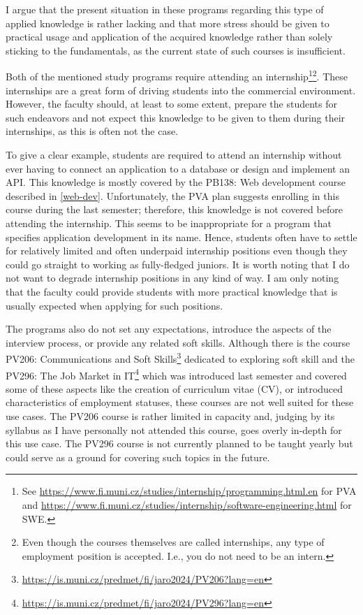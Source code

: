 \documentclass[
  digital,
  color,
  oneside,
  nosansbold,
  nocolorbold,
  nolof,
  nolot,
]{fithesis4}
\begin{document}
I argue that the present situation in these programs regarding this type of applied knowledge is rather lacking and that more stress should be given to practical usage and application of the acquired knowledge rather than solely sticking to the fundamentals, as the current state of such courses is insufficient.

Both of the mentioned study programs require attending an internship\footnote{See \url{https://www.fi.muni.cz/studies/internship/programming.html.en} for PVA and \url{https://www.fi.muni.cz/studies/internship/software-engineering.html} for SWE.}\footnote{Even though the courses themselves are called internships, any type of employment position is accepted. I.e., you do not need to be an intern.}. These internships are a great form of driving students into the commercial environment. However, the faculty should, at least to some extent, prepare the students for such endeavors and not expect this knowledge to be given to them during their internships, as this is often not the case. 

To give a clear example, students are required to attend an internship without ever having to connect an application to a database or design and implement an API. This knowledge is mostly covered by the PB138: Web development course described in \cref{web-dev}. Unfortunately, the PVA plan suggests enrolling in this course during the last semester; therefore, this knowledge is not covered before attending the internship. This seems to be inappropriate for a program that specifies application development in its name. Hence, students often have to settle for relatively limited and often underpaid internship positions even though they could go straight to working as fully-fledged juniors. It is worth noting that I do not want to degrade internship positions in any kind of way. I am only noting that the faculty could provide students with more practical knowledge that is usually expected when applying for such positions.

The programs also do not set any expectations, introduce the aspects of the interview process, or provide any related soft skills. Although there is the course PV206: Communications and Soft Skills\footnote{\url{https://is.muni.cz/predmet/fi/jaro2024/PV206?lang=en}} dedicated to exploring soft skill and the PV296: The Job Market in IT\footnote{\url{https://is.muni.cz/predmet/fi/jaro2024/PV296?lang=en}} which was introduced last semester and covered some of these aspects like the creation of curriculum vitae (CV), or introduced characteristics of employment statuses, these courses are not well suited for these use cases. The PV206 course is rather limited in capacity and, judging by its syllabus as I have personally not attended this course, goes overly in-depth for this use case. The PV296 course is not currently planned to be taught yearly but could serve as a ground for covering such topics in the future.
\end{document}
